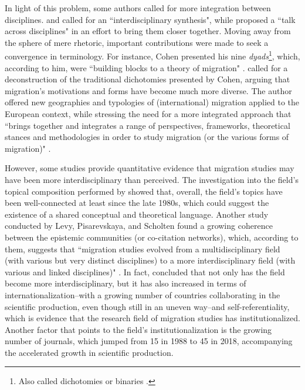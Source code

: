In light of this problem, some authors called for more integration between disciplines. \cite{king_towards_2002} and \cite{king_theories_2012} called for an ``interdisciplinary synthesis", while \cite{brettell_introduction_2015} proposed a ``talk across disciplines" in an effort to bring them closer together. Moving away from the sphere of mere rhetoric, important contributions were made to seek a convergence in terminology. For instance, Cohen presented his nine \textit{dyads}\footnote{Also called dichotomies or binaries \citep{king_theories_2012}.}, which, according to him, were ``building blocks to a theory of migration" \citep[p. xvi]{cohen_introduction_1996}. \cite{king_towards_2002} called for a deconstruction of the traditional dichotomies presented by Cohen, arguing that migration's motivations and forms have become much more diverse. The author offered new geographies and typologies of (international) migration applied to the European context, while stressing the need for a more integrated approach that ``brings together and integrates a range of perspectives, frameworks, theoretical stances and methodologies in order to study migration (or the various forms of migration)" \citep[p. 90]{king_towards_2002}.

However, some studies provide quantitative evidence that migration studies may have been more interdisciplinary than perceived. The investigation into the field's topical composition performed by \cite{pisarevskaya_mapping_2020} showed that, overall, the field's topics have been well-connected at least since the late 1980s, which could suggest the existence of a shared conceptual and theoretical language. Another study conducted by Levy, Pisarevskaya, and Scholten found a growing coherence between the epistemic communities (or co-citation networks), which, according to them, suggests that ``migration studies evolved from a multidisciplinary field (with various but very distinct disciplines) to a more interdisciplinary field (with various and linked disciplines)" \citep[p. 22-23]{levy_between_2020}. In fact, \cite{levy_between_2020} concluded that not only has the field become more interdisciplinary, but it has also increased in terms of internationalization--with a growing number of countries collaborating in the scientific production, even though still in an uneven way--and self-referentiality, which is evidence that the research field of migration studies has institutionalized. Another factor that points to the field's institutionalization is the growing number of journals, which jumped from 15 in 1988 to 45 in 2018, accompanying the accelerated growth in scientific production.

